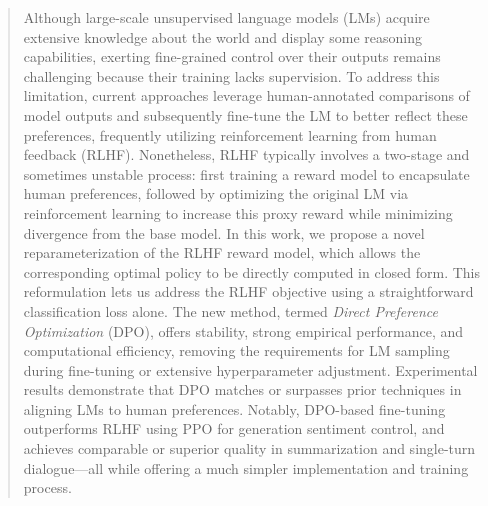 \begin{abstract}
Although large-scale unsupervised language models (LMs) acquire extensive knowledge about the world and display some reasoning capabilities, exerting fine-grained control over their outputs remains challenging because their training lacks supervision. To address this limitation, current approaches leverage human-annotated comparisons of model outputs and subsequently fine-tune the LM to better reflect these preferences, frequently utilizing reinforcement learning from human feedback (RLHF). Nonetheless, RLHF typically involves a two-stage and sometimes unstable process: first training a reward model to encapsulate human preferences, followed by optimizing the original LM via reinforcement learning to increase this proxy reward while minimizing divergence from the base model. In this work, we propose a novel reparameterization of the RLHF reward model, which allows the corresponding optimal policy to be directly computed in closed form. This reformulation lets us address the RLHF objective using a straightforward classification loss alone. The new method, termed \textit{Direct Preference Optimization} (DPO), offers stability, strong empirical performance, and computational efficiency, removing the requirements for LM sampling during fine-tuning or extensive hyperparameter adjustment. Experimental results demonstrate that DPO matches or surpasses prior techniques in aligning LMs to human preferences. Notably, DPO-based fine-tuning outperforms RLHF using PPO for generation sentiment control, and achieves comparable or superior quality in summarization and single-turn dialogue—all while offering a much simpler implementation and training process.
\end{abstract}

